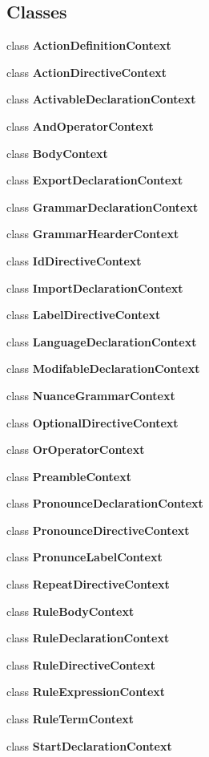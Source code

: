 \subsection*{Classes}
\begin{DoxyCompactItemize}
\item 
class {\bfseries Action\-Definition\-Context}
\item 
class {\bfseries Action\-Directive\-Context}
\item 
class {\bfseries Activable\-Declaration\-Context}
\item 
class {\bfseries And\-Operator\-Context}
\item 
class {\bfseries Body\-Context}
\item 
class {\bfseries Export\-Declaration\-Context}
\item 
class {\bfseries Grammar\-Declaration\-Context}
\item 
class {\bfseries Grammar\-Hearder\-Context}
\item 
class {\bfseries Id\-Directive\-Context}
\item 
class {\bfseries Import\-Declaration\-Context}
\item 
class {\bfseries Label\-Directive\-Context}
\item 
class {\bfseries Language\-Declaration\-Context}
\item 
class {\bfseries Modifable\-Declaration\-Context}
\item 
class {\bfseries Nuance\-Grammar\-Context}
\item 
class {\bfseries Optional\-Directive\-Context}
\item 
class {\bfseries Or\-Operator\-Context}
\item 
class {\bfseries Preamble\-Context}
\item 
class {\bfseries Pronounce\-Declaration\-Context}
\item 
class {\bfseries Pronounce\-Directive\-Context}
\item 
class {\bfseries Pronunce\-Label\-Context}
\item 
class {\bfseries Repeat\-Directive\-Context}
\item 
class {\bfseries Rule\-Body\-Context}
\item 
class {\bfseries Rule\-Declaration\-Context}
\item 
class {\bfseries Rule\-Directive\-Context}
\item 
class {\bfseries Rule\-Expression\-Context}
\item 
class {\bfseries Rule\-Term\-Context}
\item 
class {\bfseries Start\-Declaration\-Context}
\end{DoxyCompactItemize}
